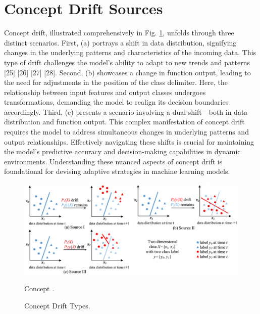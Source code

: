 \section{Concept Drift Sources}
\label{sec:background_concept_drift_sources}
Concept drift, illustrated comprehensively in Fig. \ref{fig:concept-drift-sources}, unfolds through three distinct scenarios. First, (a) portrays a shift in data distribution, signifying changes in the underlying patterns and characteristics of the incoming data. This type of drift challenges the model's ability to adapt to new trends and patterns [25] [26] [27] [28].
Second, (b) showcases a change in function output, leading to the need for adjustments in the position of the class delimiter. Here, the relationship between input features and output classes undergoes transformations, demanding the model to realign its decision boundaries accordingly.
 Third, (c) presents a scenario involving a dual shift—both in data distribution and function output. This complex manifestation of concept drift requires the model to address simultaneous changes in underlying patterns and output relationships. Effectively navigating these shifts is crucial for maintaining the model's predictive accuracy and decision-making capabilities in dynamic environments. Understanding these nuanced aspects of concept drift is foundational for devising adaptive strategies in machine learning models.
 
\begin{figure}[!ht]
    \centering
    \includegraphics[width=.9\textwidth]{2_Background/figures/concept_drift_sources.png}
    \caption{Concept .}
    \caption{Concept Drift Types.}
    \label{fig:concept-drift-sources}
\end{figure}

